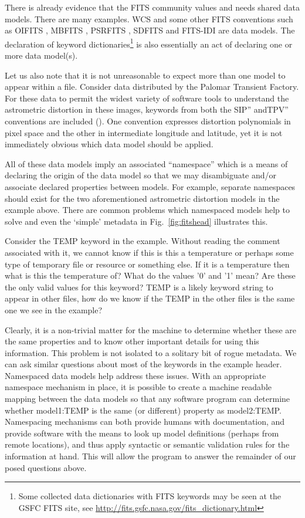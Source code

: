 \documentclass[final,authoryear,5p,times,twocolumn]{elsarticle}
\begin{document}
{{There is already evidence that the FITS community values and needs shared
data models. There are many examples. WCS and some other FITS conventions
such as OIFITS
\citep{2006SPIE.6268E.106T}, MBFITS \citep{2006A&A...454L..25M},
PSRFITS \citep{2004PASA...21..302H},
SDFITS \citep{2000ASPC..216..243G} and FITS-IDI \citep{2011AIPS114}
are data models. The declaration of keyword
dictionaries\footnote{Some collected data dictionaries with FITS
keywords may be seen at the GSFC FITS site, see
\url{http://fits.gsfc.nasa.gov/fits\_dictionary.html}} is also essentially
an act of declaring one or more data model(s).

Let us also note that it is not unreasonable to expect more than one model 
to appear within a file. Consider data distributed by the Palomar Transient 
Factory.  For these data to permit the widest
variety of software tools to understand the astrometric distortion in these
images, keywords from both the SIP'' andTPV'' conventions are included
(\citep{2006SPIE.6268E.106T}).
One convention expresses distortion polynomials in pixel space and the
other in intermediate longitude and latitude, yet it is not immediately
obvious which data model should be applied.
 

All of these data models imply an associated ``namespace'' which is
a means of declaring the origin of the data model so that we may
disambiguate and/or associate declared properties between models.
For example, separate namespaces should exist for the two aforementioned 
astrometric distortion models in the example above.
There are common problems which namespaced models help to solve and even
the `simple' metadata in Fig.~\ref{fig:fitshead} illustrates this.


Consider the TEMP keyword in the example. Without reading the comment
associated with it, we cannot know if this is this a temperature or perhaps
some type of temporary file or resource or something else. If it is a
temperature then what is this the temperature of? What do the values '0'
and '1' mean? Are these the only valid values for this keyword?  TEMP is
a likely keyword string to appear in other files, how do we know if the
TEMP in the other files is the same one we see in the example?


Clearly, it is a non-trivial matter for the machine to determine whether
these are the same properties and to know other important details for using
this information. This problem is not isolated to a solitary bit
of rogue metadata. We can ask similar questions about most of the keywords
in the example header. Namespaced data models help address these issues. With
an appropriate namespace mechanism in place, it is possible to create a
machine readable mapping between the data models so that any software program
can determine whether model1:TEMP is the same (or different) property as
model2:TEMP. 
Namespacing mechanisms can both provide humans with documentation, and 
provide software with the means to look up model definitions (perhaps from 
remote locations), and thus apply syntactic or semantic validation rules 
for the information at hand.  This will allow the program to
answer the remainder of our posed questions above.


}}
\end{document}
